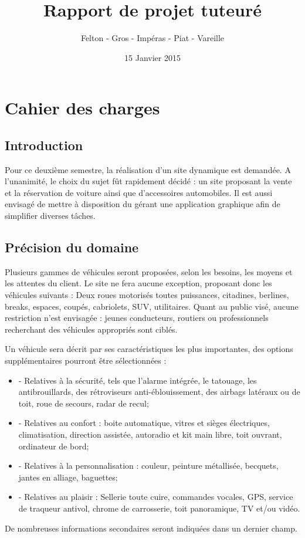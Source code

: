 \documentclass[a4paper]{article}
\title{\Huge \textbf{Rapport de projet tuteuré}}
\author{\Large Felton - Gros - Impéras - Piat - Vareille}
\date{15 Janvier 2015}
\begin{document}
\maketitle
\newpage

\tableofcontents
\newpage

\section{Cahier des charges}
	\subsection*{Introduction}
	
	Pour ce deuxième semestre, la réalisation d'un site dynamique est demandée. A l'unanimité, le choix du sujet fût rapidement décidé : un site proposant la vente et la réservation de voiture ainsi que d'accessoires automobiles. Il est aussi envisagé de mettre à disposition du gérant une application graphique afin de simplifier diverses tâches.
	\subsection{Précision du domaine}
	
	Plusieurs gammes de véhicules seront proposées, selon les besoins, les moyens et les attentes du client. Le site ne fera aucune exception, proposant donc les véhicules suivants : Deux roues motorisés toutes puissances, citadines, berlines, breaks, espaces, coupés, cabriolets, SUV, utilitaires. Quant au public visé, aucune restriction n'est envisagée : jeunes conducteurs, routiers ou professionnels recherchant des véhicules appropriés sont ciblés.
	
	Un véhicule sera décrit par ses caractéristiques les plus importantes, des options supplémentaires pourront être sélectionnées :
	\begin {itemize}
		\item[-] Relatives à la sécurité, tels que l'alarme intégrée, le tatouage, les antibrouillards, des rétroviseurs anti-éblouissement, des airbags latéraux ou de toit, roue de secours, radar de recul;
		\item[-] Relatives au confort : boite automatique, vitres et sièges électriques, climatisation, direction assistée, autoradio et kit main libre, toit ouvrant, ordinateur de bord;
		\item[-] Relatives à la personnalisation : couleur, peinture métallisée, becquets, jantes en alliage, baguettes;
		\item[-] Relatives au plaisir : Sellerie toute cuire, commandes vocales, GPS, service de traqueur antivol, chrome de carrosserie, toit panoramique, TV et/ou vidéo.
	\end {itemize}
	De nombreuses informations secondaires seront indiquées dans un dernier champ.
\end{document}
